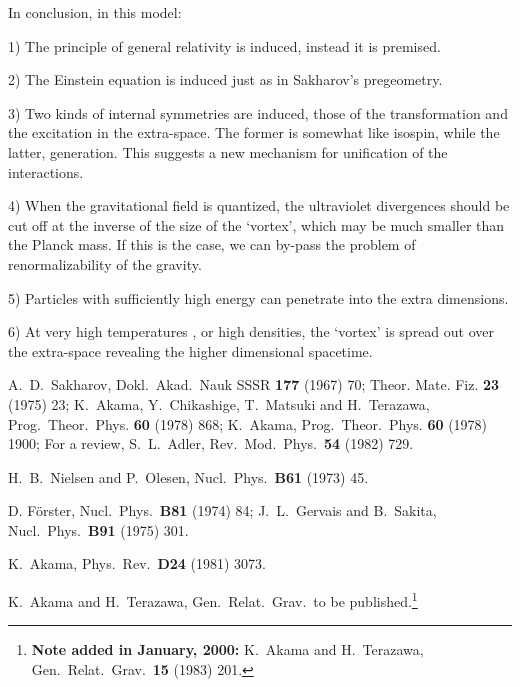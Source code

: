 \documentclass[a4paper,12pt]{article}
\begin{document}
In conclusion, in this model:

\vskip0pt\noindent\hskip-20pt 1)\vskip-15pt\noindent 
The principle of general relativity is induced, instead it is premised.

\vskip0pt\noindent\hskip-20pt 2)\vskip-15pt\noindent 
The Einstein equation is induced just as in Sakharov's pregeometry.

\vskip0pt\noindent\hskip-20pt 3)\vskip-15pt\noindent 
Two kinds of internal symmetries are induced, those of the transformation and
the excitation in the extra-space. 
The former is somewhat like isospin,
while the latter, generation.
This suggests a new mechanism for unification of the interactions.

\vskip0pt\noindent\hskip-20pt 4)\vskip-15pt\noindent 
When the gravitational field is quantized, 
the ultraviolet divergences should be cut off at the inverse of the size of the `vortex', 
which may be much smaller than the Planck mass.
If this is the case, we can by-pass the problem of renormalizability of the gravity.

\vskip0pt\noindent\hskip-20pt 5)\vskip-15pt\noindent 
Particles with sufficiently high energy can penetrate into the extra dimensions.

\vskip0pt\noindent\hskip-20pt 6)\vskip-15pt\noindent 
At very high temperatures \cite{5}, or high densities, 
the `vortex' is spread out over the extra-space 
revealing the higher dimensional spacetime.


\begin{thebibliography}{99}
A.~D.~Sakharov,  Dokl.\ Akad.\ Nauk SSSR {\bf 177} (1967) 70;
Theor. Mate. Fiz. {\bf 23} (1975) 23;
K.~Akama, Y.~Chikashige, T.~Matsuki and H.~Terazawa,
	 {Prog.\ Theor.\ Phys.} {\bf 60} (1978) 868;
K.~Akama,  {Prog.\ Theor.\ Phys.} {\bf 60} (1978) 1900;
For a review, S.~L.~Adler, Rev.\ Mod.\ Phys.\ {\bf 54} (1982) 729. 

H.~B.~Nielsen and P.~Olesen, Nucl.\ Phys.\ {\bf B61} (1973) 45.

D. F\"orster, Nucl.\ Phys.\ {\bf B81} (1974) 84;
J.~L.~Gervais and B.~Sakita, Nucl.\ Phys.\ {\bf B91} (1975) 301.

K.~Akama, Phys.\ Rev.\ {\bf D24} (1981) 3073.

K.~Akama and H.~Terazawa, Gen.\ Relat.\ Grav.\ to be published.\footnote{
{\small\bf Note added in January, 2000:} 
K.~Akama and H.~Terazawa, Gen.\ Relat.\ Grav.\ {\bf 15} (1983) 201.
}

\end{thebibliography}
\end{document}
